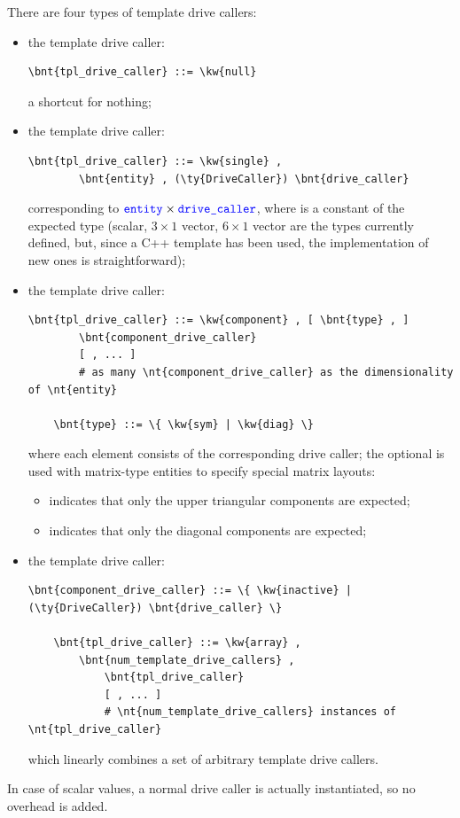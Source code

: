 There are four types of template drive callers:
\begin{itemize}
\item the  template drive caller:
\begin{Verbatim}[commandchars=\\\{\}]
    \bnt{tpl_drive_caller} ::= \kw{null}
\end{Verbatim}
a shortcut for nothing;
\item the  template drive caller:
\begin{Verbatim}[commandchars=\\\{\}]
    \bnt{tpl_drive_caller} ::= \kw{single} ,
        \bnt{entity} , (\ty{DriveCaller}) \bnt{drive_caller}
\end{Verbatim}
corresponding to $\textcolor{blue}{\texttt{entity}}\times\textcolor{blue}{\texttt{drive\_caller}}$,
where  is a constant of the expected type (scalar, $3 \times 1$ 
vector, $6 \times 1$ vector are the types currently defined, but, since 
a C++ template has been used, the implementation of new ones 
is straightforward);

\item the  template drive caller:
\begin{Verbatim}[commandchars=\\\{\}]
    \bnt{tpl_drive_caller} ::= \kw{component} , [ \bnt{type} , ]
        \bnt{component_drive_caller}
        [ , ... ]
        # as many \nt{component_drive_caller} as the dimensionality of \nt{entity}

    \bnt{type} ::= \{ \kw{sym} | \kw{diag} \}
\end{Verbatim}
where each element consists of the corresponding drive caller;
the optional  is used with matrix-type entities to specify
special matrix layouts:
\begin{itemize}
\item {} indicates that only the upper triangular components are expected;
\item {} indicates that only the diagonal components are expected;
\end{itemize}

\item the  template drive caller:
\begin{Verbatim}[commandchars=\\\{\}]
    \bnt{component_drive_caller} ::= \{ \kw{inactive} | (\ty{DriveCaller}) \bnt{drive_caller} \}

    \bnt{tpl_drive_caller} ::= \kw{array} ,
        \bnt{num_template_drive_callers} ,
            \bnt{tpl_drive_caller}
            [ , ... ]
            # \nt{num_template_drive_callers} instances of \nt{tpl_drive_caller}
\end{Verbatim}
which linearly combines a set of arbitrary template drive callers.
\end{itemize}
In case of scalar values, a normal drive caller is actually instantiated,
so no overhead is added.

